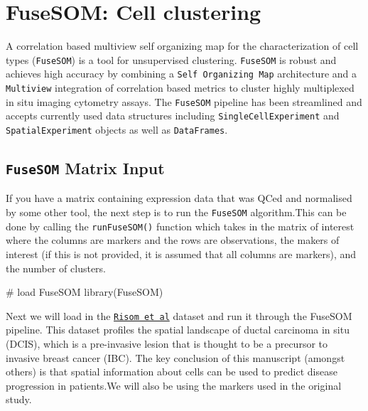\documentclass[
  letterpaper,
  DIV=11,
  numbers=noendperiod]{scrreprt}
\newenvironment{Shaded}{\begin{snugshade}}{\end{snugshade}}
\newcommand{\CommentTok}[1]{\textcolor[rgb]{0.37,0.37,0.37}{#1}}
\newcommand{\FunctionTok}[1]{\textcolor[rgb]{0.28,0.35,0.67}{#1}}
\newcommand{\NormalTok}[1]{\textcolor[rgb]{0.00,0.23,0.31}{#1}}
\begin{document}
\section{FuseSOM: Cell clustering}\label{fusesom-cell-clustering}

A correlation based multiview self organizing map for the
characterization of cell types (\texttt{FuseSOM}) is a tool for
unsupervised clustering. \texttt{FuseSOM} is robust and achieves high
accuracy by combining a \texttt{Self\ Organizing\ Map} architecture and
a \texttt{Multiview} integration of correlation based metrics to cluster
highly multiplexed in situ imaging cytometry assays. The
\texttt{FuseSOM} pipeline has been streamlined and accepts currently
used data structures including \texttt{SingleCellExperiment} and
\texttt{SpatialExperiment} objects as well as \texttt{DataFrames}.

\subsection{\texorpdfstring{\texttt{FuseSOM} Matrix
Input}{FuseSOM Matrix Input}}\label{fusesom-matrix-input}

If you have a matrix containing expression data that was QCed and
normalised by some other tool, the next step is to run the
\texttt{FuseSOM} algorithm.This can be done by calling the
\texttt{runFuseSOM()} function which takes in the matrix of interest
where the columns are markers and the rows are observations, the makers
of interest (if this is not provided, it is assumed that all columns are
markers), and the number of clusters.

\begin{Shaded}
\begin{Highlighting}[]
\CommentTok{\# load FuseSOM}
\FunctionTok{library}\NormalTok{(FuseSOM)}
\end{Highlighting}
\end{Shaded}

Next we will load in the
\href{https://www.sciencedirect.com/science/article/pii/S0092867421014860?via\%3Dihub}{\texttt{Risom\ et\ al}}
dataset and run it through the FuseSOM pipeline. This dataset profiles
the spatial landscape of ductal carcinoma in situ (DCIS), which is a
pre-invasive lesion that is thought to be a precursor to invasive breast
cancer (IBC). The key conclusion of this manuscript (amongst others) is
that spatial information about cells can be used to predict disease
progression in patients.We will also be using the markers used in the
original study.
\end{document}
